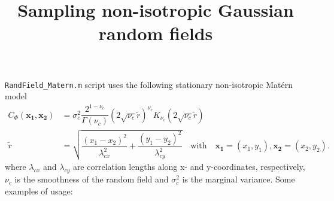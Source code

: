 \documentclass{extarticle}
\title{Sampling non-isotropic Gaussian random fields}
\author{}
\date{}
\begin{document}
\maketitle
\texttt{RandField\_Matern.m} script  uses the following stationary non-isotropic Mat\'ern model 
\begin{align}
C_\Phi(\mathbf{x_1},\mathbf{x_2}) &= \sigma_c^2\dfrac{2^{1-\nu_c}}{\Gamma(\nu_c)}\left( 2\sqrt{\nu_c}\tilde{r}\right)^{\nu_c} K_{\nu_c}\left( 2\sqrt{\nu_c}\tilde{r}\right)\\
\tilde{r}  &= \sqrt{\dfrac{(x_1-x_2)^2}{\lambda^2_{cx}}+ \dfrac{(y_1-y_2)^2}{\lambda^2_{cy}}}\quad\text{with}\quad \mathbf{x_1} = (x_1,y_1),\mathbf{x_2} = (x_2,y_2).
\end{align}
where $\lambda_{cx}$ and $\lambda_{cy}$ are correlation lengths along x- and y-coordinates, respectively, $\nu_c$ is the smoothness of the random field and $\sigma^2_c$ is the marginal variance. Some examples of usage:
\end{document}
